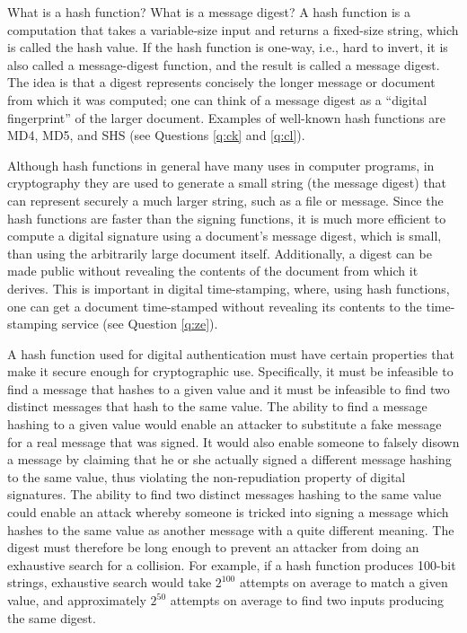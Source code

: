 {What is a hash function? What is a message digest?}
A hash function is a computation that takes a variable-size input and returns
a fixed-size string, which is called the hash value. If the hash function
is one-way, i.e., hard to invert, it is also called a message-digest function,
and the result is called a message digest. The idea is that a digest 
represents concisely the longer message or document from which it was 
computed; one can think of a message digest as a ``digital fingerprint'' of 
the larger document. Examples of well-known hash functions are MD4, MD5, 
and SHS (see Questions \ref{q:ck} and \ref{q:cl}).

Although hash functions in general have many uses in computer programs, in 
cryptography they are used to generate a small string (the message digest) 
that can represent securely a much larger string, such as a file or message. 
Since the hash functions are faster than the signing functions, it is much 
more efficient to compute a digital signature using a document's message 
digest, which is small, than using the arbitrarily large document itself. 
Additionally, a digest can be made public without revealing the contents of 
the document from which it derives. This is important in digital 
time-stamping, where, using hash functions, one can get a document 
time-stamped without revealing its contents to the time-stamping service 
(see Question \ref{q:ze}). 

A hash function used for digital authentication must have certain 
properties that make it secure enough for cryptographic use. Specifically,  
it must be infeasible to find a message that hashes to a given value
and it must be infeasible to find two distinct messages that hash to 
the same value. The ability to find a message hashing to a given value
would enable an attacker to substitute a fake message for a real message
that was signed. It would also enable someone to falsely disown a 
message by claiming that he or she actually signed a different message 
hashing to the same value, thus violating the non-repudiation property
of digital signatures. The ability to find two distinct messages hashing 
to the same value could enable an attack whereby someone is tricked into 
signing a message which hashes to the same value as another message with 
a quite different meaning. The digest must therefore be long enough to 
prevent an attacker from doing an exhaustive search for a collision. For 
example, if a hash function produces 100-bit strings, exhaustive search 
would take $2^{100}$ attempts on average to match a given value, and 
approximately $2^{50}$ attempts on average to find two inputs producing 
the same digest. 

